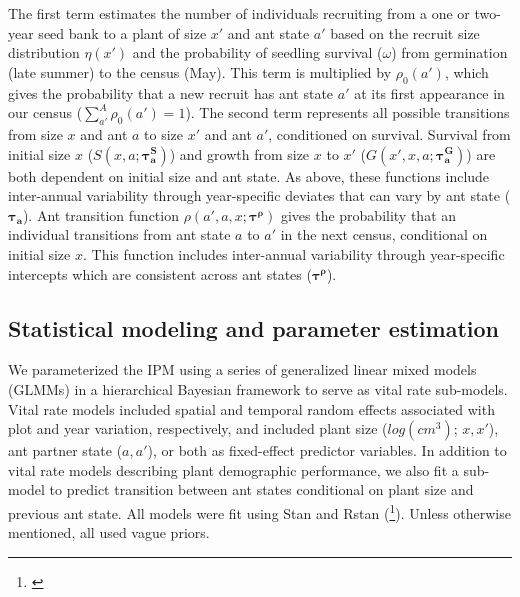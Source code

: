 \documentclass[11pt]{article}
\newcommand{\tom}[2]{{\color{red}{#1}}\footnote{\textit{\color{red}{#2}}}}
\begin{document}
\noindent The first term estimates the number of individuals recruiting from a one or two-year seed bank to a plant of size $x'$ and ant state $a'$ based on the recruit size distribution $\eta(x')$ and the probability of seedling survival ($\omega$) from germination (late summer) to the census (May).
This term is multiplied by $\rho_{0}(a')$, which gives the probability that a new recruit has ant state $a'$ at its first appearance in our census ($\sum_{a'}^{A}\rho_{0}(a')=1$). 
The second term represents all possible transitions from size $x$ and ant $a$ to size $x'$ and ant $a'$, conditioned on survival. 
Survival from initial size $x$ ($S(x,a;\pmb{\tau^S_{a}})$) and growth from size $x$ to $x'$ ($G(x',x,a;\pmb{\tau^G_{a}})$) are both dependent on initial size and ant state. 
As above, these functions include inter-annual variability through year-specific deviates that can vary by ant state ($\pmb{\tau_{a}}$). 
Ant transition function $\rho(a',a,x;\pmb{\tau^{\rho}})$ gives the probability that an individual transitions from ant state $a$ to $a'$ in the next census, conditional on initial size $x$. 
This function includes inter-annual variability through year-specific intercepts which are consistent across ant states ($\pmb{\tau^\rho}$).

\subsection*{Statistical modeling and parameter estimation}
We parameterized the IPM using a series of generalized linear mixed models (GLMMs) in a hierarchical Bayesian framework to serve as vital rate sub-models. 
Vital rate models included spatial and temporal random effects associated with plot and year variation, respectively, and included plant size ($log(cm^3)$; $x,x'$), ant partner state ($a,a'$), or both as fixed-effect predictor variables. 
In addition to vital rate models describing plant demographic performance, we also fit a sub-model to predict transition between ant states conditional on plant size and previous ant state. 
All models were fit using Stan and Rstan (\tom{}{Cite Stan and RStan.}). 
Unless otherwise mentioned, all used vague priors. 
\end{document}
